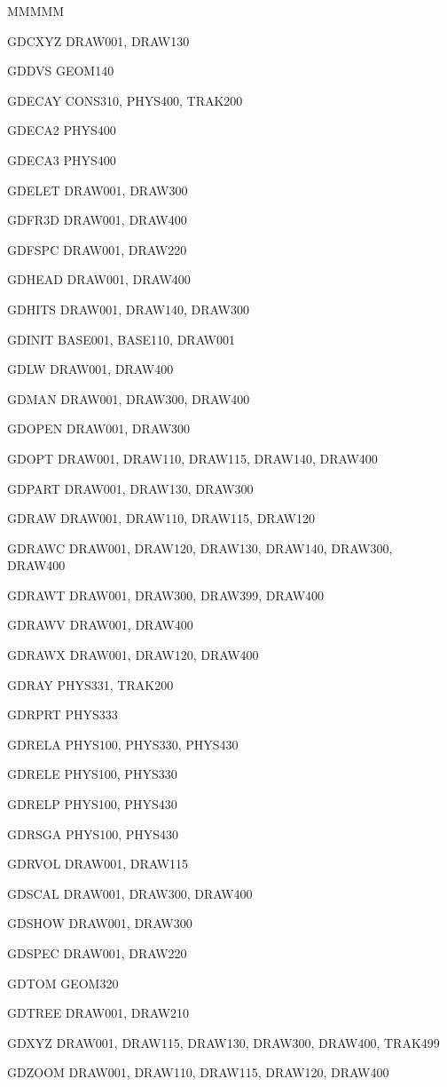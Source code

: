 {\begin{DL}{MMMMM}
\item[GDCXYZ]DRAW001, DRAW130
\item[GDDVS ]GEOM140
\item[GDECAY]CONS310, PHYS400, TRAK200
\item[GDECA2]PHYS400
\item[GDECA3]PHYS400
\item[GDELET]DRAW001, DRAW300
\item[GDFR3D]DRAW001, DRAW400
\item[GDFSPC]DRAW001, DRAW220
\item[GDHEAD]DRAW001, DRAW400
\item[GDHITS]DRAW001, DRAW140, DRAW300
\item[GDINIT]BASE001, BASE110, DRAW001
\item[GDLW  ]DRAW001, DRAW400
\item[GDMAN ]DRAW001, DRAW300, DRAW400
\item[GDOPEN]DRAW001, DRAW300
\item[GDOPT ]DRAW001, DRAW110, DRAW115, DRAW140, DRAW400
\item[GDPART]DRAW001, DRAW130, DRAW300
\item[GDRAW ]DRAW001, DRAW110, DRAW115, DRAW120
\item[GDRAWC]DRAW001, DRAW120, DRAW130, DRAW140, DRAW300, DRAW400
\item[GDRAWT]DRAW001, DRAW300, DRAW399, DRAW400
\item[GDRAWV]DRAW001, DRAW400
\item[GDRAWX]DRAW001, DRAW120, DRAW400
\item[GDRAY ]PHYS331, TRAK200
\item[GDRPRT]PHYS333
\item[GDRELA]PHYS100, PHYS330, PHYS430
\item[GDRELE]PHYS100, PHYS330
\item[GDRELP]PHYS100, PHYS430
\item[GDRSGA]PHYS100, PHYS430
\item[GDRVOL]DRAW001, DRAW115
\item[GDSCAL]DRAW001, DRAW300, DRAW400
\item[GDSHOW]DRAW001, DRAW300
\item[GDSPEC]DRAW001, DRAW220
\item[GDTOM ]GEOM320
\item[GDTREE]DRAW001, DRAW210
\item[GDXYZ ]DRAW001, DRAW115, DRAW130, DRAW300, DRAW400, TRAK499
\item[GDZOOM]DRAW001, DRAW110, DRAW115, DRAW120, DRAW400

\end{DL}}
